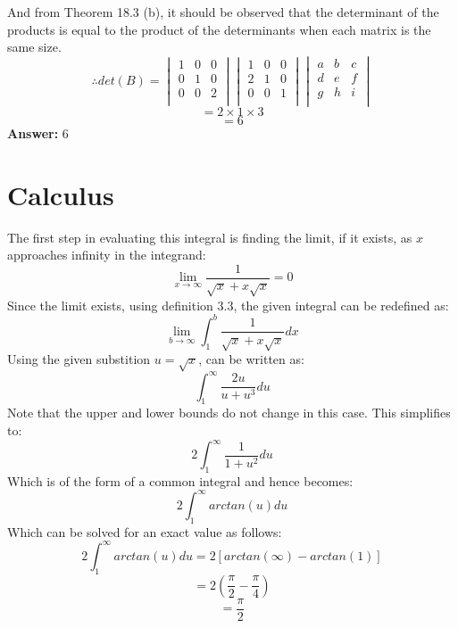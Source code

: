 \documentclass[11pt]{article}
\begin{document}
And from Theorem 18.3 (b), it should be observed that the determinant of the products is equal to the product of the determinants when each matrix is the same size.
$$\therefore det(B)=
\begin{vmatrix}
1 & 0 & 0 \\
0 & 1 & 0 \\
0 & 0 & 2 \\
\end{vmatrix}
\begin{vmatrix}
1 & 0 & 0 \\
2 & 1 & 0 \\
0 & 0 & 1 \\
\end{vmatrix}
\begin{vmatrix}
a & b & c \\
d & e & f \\
g & h & i \\
\end{vmatrix}
$$
$$=2\times 1\times 3$$
$$=6$$
\textbf{Answer: }6
\section*{Calculus}
The first step in evaluating this integral is finding the limit, if it exists, as $x$ approaches infinity in the integrand:
$$\lim_{x\to \infty} \frac{1}{\sqrt{x}+x\sqrt{x}} = 0$$
Since the limit exists, using definition 3.3, the given integral can be redefined as:
$$\lim_{b\to \infty}\int_1^b \frac{1}{\sqrt{x}+x\sqrt{x}}dx$$
Using the given substition $u=\sqrt{x}$, can be written as:
$$\int_1^\infty \frac{2u}{u+u^3}du$$
Note that the upper and lower bounds do not change in this case. This simplifies to:
$$2\int_1^\infty \frac{1}{1+u^2}du$$
Which is of the form of a common integral and hence becomes:
$$2\int_1^\infty arctan(u)du$$
Which can be solved for an exact value as follows:
$$2\int_1^\infty arctan(u)du=2[arctan(\infty)-arctan(1)]$$
$$=2(\frac{\pi}{2}-\frac{\pi}{4})$$
$$=\frac{\pi}{2}$$
\end{document}
